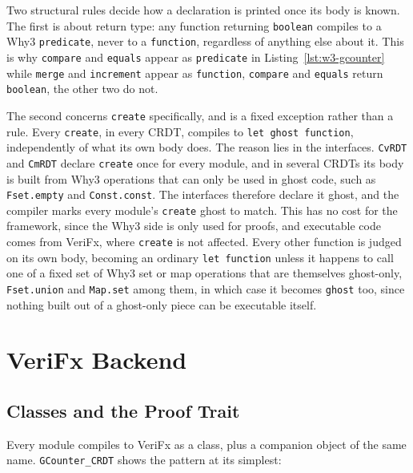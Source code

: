 Two structural rules decide how a declaration is printed once its body is known. The first is about return type: any
function returning \texttt{boolean} compiles to a Why3 \texttt{predicate}, never to a \texttt{function}, regardless of
anything else about it. This is why \texttt{compare} and \texttt{equals} appear as \texttt{predicate} in
Listing~\ref{lst:w3-gcounter} while \texttt{merge} and \texttt{increment} appear as \texttt{function}, \texttt{compare}
and \texttt{equals} return \texttt{boolean}, the other two do not.

The second concerns \texttt{create} specifically, and is a fixed exception rather than a rule. Every \texttt{create}, in
every CRDT, compiles to \texttt{let ghost function}, independently of what its own body does. The reason lies in the
interfaces. \texttt{CvRDT} and \texttt{CmRDT} declare \texttt{create} once for every module, and in several CRDTs its body
is built from Why3 operations that can only be used in ghost code, such as \texttt{Fset.empty} and \texttt{Const.const}.
The interfaces therefore declare it ghost, and the compiler marks every module's \texttt{create} ghost to match. This has no
cost for the framework, since the Why3 side is only used for proofs, and executable code comes from VeriFx, where
\texttt{create} is not affected. Every other function is judged on its own body, becoming an ordinary \texttt{let function}
unless it happens to call one of a fixed set of Why3 set or map operations that are themselves ghost-only, \texttt{Fset.union} and
\texttt{Map.set} among them, in which case it becomes \texttt{ghost} too, since nothing built out of a ghost-only piece can
be executable itself.

\section{VeriFx Backend}
\label{sec:vfx-backend}

\subsection{Classes and the Proof Trait}
\label{sub:vfx-classes}

Every module compiles to VeriFx as a class, plus a companion object of the same name. \texttt{GCounter\_CRDT} shows the
pattern at its simplest:

